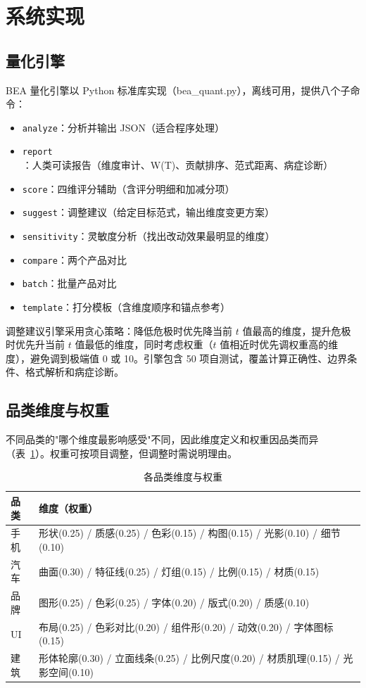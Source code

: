 \documentclass[10pt,a4paper]{article}
\begin{document}
\section{系统实现}

\subsection{量化引擎}

BEA 量化引擎以 Python 标准库实现（bea\_quant.py），离线可用，提供八个子命令：

\begin{itemize}[leftmargin=*]
\item \texttt{analyze}：分析并输出 JSON（适合程序处理）
\item \texttt{report}：人类可读报告（维度审计、W(T)、贡献排序、范式距离、病症诊断）
\item \texttt{score}：四维评分辅助（含评分明细和加减分项）
\item \texttt{suggest}：调整建议（给定目标范式，输出维度变更方案）
\item \texttt{sensitivity}：灵敏度分析（找出改动效果最明显的维度）
\item \texttt{compare}：两个产品对比
\item \texttt{batch}：批量产品对比
\item \texttt{template}：打分模板（含维度顺序和锚点参考）
\end{itemize}

调整建议引擎采用贪心策略：降低危极时优先降当前 $t$ 值最高的维度，提升危极时优先升当前 $t$ 值最低的维度，同时考虑权重（$t$ 值相近时优先调权重高的维度），避免调到极端值 0 或 10。引擎包含 50 项自测试，覆盖计算正确性、边界条件、格式解析和病症诊断。

\subsection{品类维度与权重}

不同品类的"哪个维度最影响感受"不同，因此维度定义和权重因品类而异（表~\ref{tab:categories}）。权重可按项目调整，但调整时需说明理由。

\begin{table}[H]
\centering
\caption{各品类维度与权重}
\label{tab:categories}
\begin{tabular}{p{1.5cm}p{9.5cm}}
\toprule
\textbf{品类} & \textbf{维度（权重）} \\
\midrule
手机 & 形状(0.25) / 质感(0.25) / 色彩(0.15) / 构图(0.15) / 光影(0.10) / 细节(0.10) \\
汽车 & 曲面(0.30) / 特征线(0.25) / 灯组(0.15) / 比例(0.15) / 材质(0.15) \\
品牌 & 图形(0.25) / 色彩(0.25) / 字体(0.20) / 版式(0.20) / 质感(0.10) \\
UI & 布局(0.25) / 色彩对比(0.20) / 组件形(0.20) / 动效(0.20) / 字体图标(0.15) \\
建筑 & 形体轮廓(0.30) / 立面线条(0.25) / 比例尺度(0.20) / 材质肌理(0.15) / 光影空间(0.10) \\
\bottomrule
\end{tabular}
\end{table}
\end{document}
